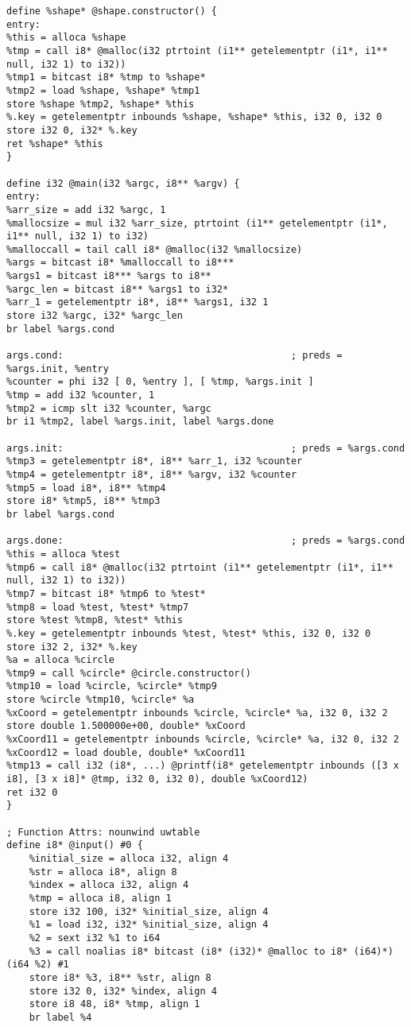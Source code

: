 \begin{verbatim}
define %shape* @shape.constructor() {
entry:
%this = alloca %shape
%tmp = call i8* @malloc(i32 ptrtoint (i1** getelementptr (i1*, i1** null, i32 1) to i32))
%tmp1 = bitcast i8* %tmp to %shape*
%tmp2 = load %shape, %shape* %tmp1
store %shape %tmp2, %shape* %this
%.key = getelementptr inbounds %shape, %shape* %this, i32 0, i32 0
store i32 0, i32* %.key
ret %shape* %this
}

define i32 @main(i32 %argc, i8** %argv) {
entry:
%arr_size = add i32 %argc, 1
%mallocsize = mul i32 %arr_size, ptrtoint (i1** getelementptr (i1*, i1** null, i32 1) to i32)
%malloccall = tail call i8* @malloc(i32 %mallocsize)
%args = bitcast i8* %malloccall to i8***
%args1 = bitcast i8*** %args to i8**
%argc_len = bitcast i8** %args1 to i32*
%arr_1 = getelementptr i8*, i8** %args1, i32 1
store i32 %argc, i32* %argc_len
br label %args.cond

args.cond:                                        ; preds = %args.init, %entry
%counter = phi i32 [ 0, %entry ], [ %tmp, %args.init ]
%tmp = add i32 %counter, 1
%tmp2 = icmp slt i32 %counter, %argc
br i1 %tmp2, label %args.init, label %args.done

args.init:                                        ; preds = %args.cond
%tmp3 = getelementptr i8*, i8** %arr_1, i32 %counter
%tmp4 = getelementptr i8*, i8** %argv, i32 %counter
%tmp5 = load i8*, i8** %tmp4
store i8* %tmp5, i8** %tmp3
br label %args.cond

args.done:                                        ; preds = %args.cond
%this = alloca %test
%tmp6 = call i8* @malloc(i32 ptrtoint (i1** getelementptr (i1*, i1** null, i32 1) to i32))
%tmp7 = bitcast i8* %tmp6 to %test*
%tmp8 = load %test, %test* %tmp7
store %test %tmp8, %test* %this
%.key = getelementptr inbounds %test, %test* %this, i32 0, i32 0
store i32 2, i32* %.key
%a = alloca %circle
%tmp9 = call %circle* @circle.constructor()
%tmp10 = load %circle, %circle* %tmp9
store %circle %tmp10, %circle* %a
%xCoord = getelementptr inbounds %circle, %circle* %a, i32 0, i32 2
store double 1.500000e+00, double* %xCoord
%xCoord11 = getelementptr inbounds %circle, %circle* %a, i32 0, i32 2
%xCoord12 = load double, double* %xCoord11
%tmp13 = call i32 (i8*, ...) @printf(i8* getelementptr inbounds ([3 x i8], [3 x i8]* @tmp, i32 0, i32 0), double %xCoord12)
ret i32 0
}

; Function Attrs: nounwind uwtable
define i8* @input() #0 {
	%initial_size = alloca i32, align 4
	%str = alloca i8*, align 8
	%index = alloca i32, align 4
	%tmp = alloca i8, align 1
	store i32 100, i32* %initial_size, align 4
	%1 = load i32, i32* %initial_size, align 4
	%2 = sext i32 %1 to i64
	%3 = call noalias i8* bitcast (i8* (i32)* @malloc to i8* (i64)*)(i64 %2) #1
	store i8* %3, i8** %str, align 8
	store i32 0, i32* %index, align 4
	store i8 48, i8* %tmp, align 1
	br label %4
	

\end{verbatim}
